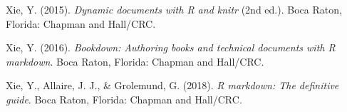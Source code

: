 \documentclass[
  british,
  a4paper,
  ,man,mask,floatsintext]{apa6}
\newlength{\cslhangindent}
\newenvironment{CSLReferences}[2] %
 {\begin{list}{}{%
  \setlength{\itemindent}{0pt}
  \setlength{\leftmargin}{0pt}
  \setlength{\parsep}{0pt}
  \ifodd #1
   \setlength{\leftmargin}{\cslhangindent}
   \setlength{\itemindent}{-1\cslhangindent}
  \fi
  \setlength{\itemsep}{#2\baselineskip}}}
 {\end{list}}
\begin{document}
\begin{CSLReferences}{1}{0}
Xie, Y. (2015). \emph{Dynamic documents with {R} and knitr} (2nd ed.). Boca Raton, Florida: {Chapman and Hall/CRC}.

Xie, Y. (2016). \emph{Bookdown: {Authoring} books and technical documents with {R} markdown}. Boca Raton, Florida: {Chapman and Hall/CRC}.

Xie, Y., Allaire, J. J., \& Grolemund, G. (2018). \emph{R markdown: {The} definitive guide}. Boca Raton, Florida: {Chapman and Hall/CRC}.

\end{CSLReferences}
\end{document}

